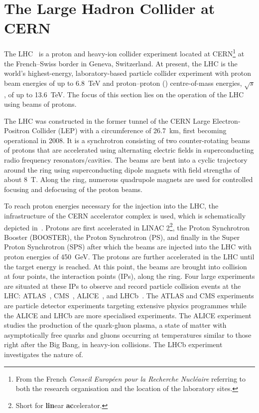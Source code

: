 \section{The Large Hadron Collider at CERN}%
\label{sec:lhc}

The LHC~\cite{Evans:2008zzb} is a proton and heavy-ion collider experiment
located at CERN\footnote{From the French \emph{Conseil Européen pour la
    Recherche Nucléaire} referring to both the research organisation and the
  location of the laboratory sites.} at the French--Swiss border in Geneva,
Switzerland. At present, the LHC is the world's highest-energy, laboratory-based
particle collider experiment with proton beam energies of up to \SI{6.8}{\TeV}
and proton--proton (\pp) centre-of-mass energies, $\sqrt{s}$, of up to
\SI{13.6}{\TeV}. The focus of this section lies on the operation of the LHC
using beams of protons.

The LHC was constructed in the former tunnel of the CERN Large Electron-Positron
Collider (LEP) with a circumference of \SI{26.7}{\kilo\metre}, first becoming
operational in 2008. It is a synchrotron consisting of two counter-rotating
beams of protons that are accelerated using alternating electric fields in
superconducting radio frequency resonators/cavities. The beams are bent into a
cyclic trajectory around the ring using superconducting dipole magnets with
field strengths of about \SI{8}{\tesla}. Along the ring, numerous quadrupole
magnets are used for controlled focusing and defocusing of the proton beams.

To reach proton energies necessary for the injection into the LHC, the
infrastructure of the CERN accelerator complex is used, which is schematically
depicted in~. Protons are first accelerated
in LINAC 2\footnote{Short for \textbf{lin}ear \textbf{ac}celerator.}, the Proton
Synchrotron Booster (BOOSTER), the Proton Synchrotron (PS), and finally in the
Super Proton Synchrotron (SPS) after which the beams are injected into the LHC
with proton energies of \SI{450}{\GeV}. The protons are further accelerated in
the LHC until the target energy is reached. At this point, the beams are brought
into collision at four points, the interaction points (IPs), along the
ring. Four large experiments are situated at these IPs to observe and record
particle collision events at the LHC: ATLAS~\cite{PERF-2007-01},
CMS~\cite{CMS-CMS-00-001}, ALICE~\cite{ALICE:2008ngc}, and
LHCb~\cite{LHCb:2008vvz}. The ATLAS and CMS experiments are particle detector
experiments targeting extensive physics programmes while the ALICE and LHCb are
more specialised experiments. The ALICE experiment studies the production of the
quark-gluon plasma, a state of matter with asymptotically free quarks and gluons
occurring at temperatures similar to those right after the Big Bang, in
heavy-ion collisions. The LHCb experiment investigates the nature of.


